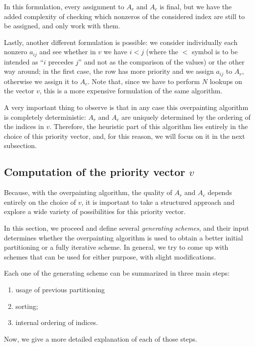 In this formulation, every assignment to $A_r$ and $A_c$ is final, but we have the added complexity of checking which nonzeros of the considered index are still to be assigned, and only work with them.

Lastly, another different formulation is possible: we consider individually each nonzero $a_{ij}$ and see whether in $v$ we have $i < j$ (where the $<$ symbol is to be intended as ``$i$ precedes $j$'' and not as the comparison of the values) or the other way around; in the first case, the row has more priority and we assign $a_{ij}$ to $A_r$, otherwise we assign it to $A_c$. Note that, since we have to perform $N$ lookups on the vector $v$, this is a more expensive formulation of the same algorithm.

A very important thing to observe is that in any case this overpainting algorithm is completely deterministic: $A_r$ and $A_c$ are uniquely determined by the ordering of the indices in $v$. Therefore, the heuristic part of this algorithm lies entirely in the choice of this priority vector, and, for this reason, we will focus on it in the next subsection. 

\subsection{Computation of the priority vector $v$}

Because, with the overpainting algorithm, the quality of $A_r$ and $A_c$ depends entirely on the choice of $v$, it is important to take a structured approach and explore a wide variety of possibilities for this priority vector.

In this section, we proceed and define several \emph{generating schemes}, and their input determines whether the overpainting algorithm is used to obtain a better initial partitioning or a fully iterative scheme. In general, we try to come up with schemes that can be used for either purpose, with slight modifications. 

Each one of the generating scheme can be summarized in three main steps:

\begin{enumerate}
	\item usage of previous partitioning
	\item sorting;
	\item internal ordering of indices.
\end{enumerate}

Now, we give a more detailed explanation of each of those steps. 

